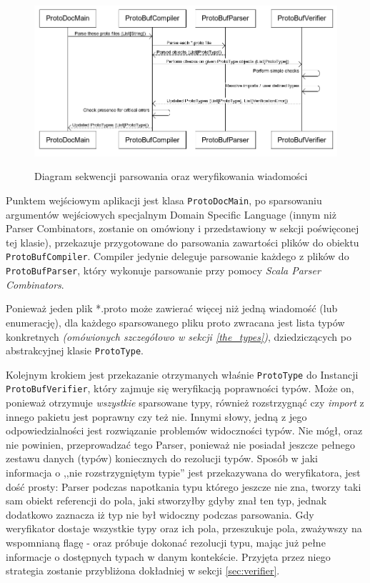 \documentclass[pdflatex,11pt]{aghdpl}
\begin{document}
\begin{figure}[ch]
\begin{center}
 \includegraphics[width=\textwidth]{compile_sequence}
 \label{fig:sequence_diagram_parsing}
\end{center}
\caption{Diagram sekwencji parsowania oraz weryfikowania wiadomości}
\end{figure}

Punktem wejściowym aplikacji jest klasa \verb|ProtoDocMain|, po sparsowaniu argumentów wejściowych specjalnym Domain Specific Language (innym niż
Parser Combinators, zostanie on omówiony i przedstawiony w sekcji poświęconej tej klasie), przekazuje przygotowane do parsowania zawartości plików
do obiektu \verb|ProtoBufCompiler|. Compiler jedynie deleguje parsowanie każdego z plików do \verb|ProtoBufParser|, który wykonuje parsowanie przy pomocy
\textit{Scala Parser Combinators}. 

Ponieważ jeden plik *.proto może zawierać więcej niż jedną wiadomość (lub enumerację), dla każdego sparsowanego
pliku proto zwracana jest lista typów konkretnych \textit{(omówionych szczegółowo w sekcji \ref{the_types})}, dziedziczących po abstrakcyjnej klasie \verb|ProtoType|. 

Kolejnym krokiem jest przekazanie otrzymanych właśnie \verb|ProtoType| do Instancji \verb|ProtoBufVerifier|, który zajmuje się weryfikacją poprawności typów.
Może on, ponieważ otrzymuje \textit{wszystkie} sparsowane typy, również rozstrzygnąć czy \textit{import} z innego pakietu jest poprawny czy też nie. 
Innymi słowy, jedną z jego odpowiedzialności jest rozwiązanie problemów widoczności typów. Nie mógł, oraz nie powinien, przeprowadzać tego Parser, ponieważ 
nie posiadał jeszcze pełnego zestawu danych (typów) koniecznych do rezolucji typów. Sposób w jaki informacja o ,,nie rozstrzygniętym typie'' jest przekazywana
do weryfikatora, jest dość prosty: Parser podczas napotkania typu którego jeszcze nie zna, tworzy taki sam obiekt referencji do pola, jaki stworzyłby gdyby
znał ten typ, jednak dodatkowo zaznacza iż typ nie był widoczny podczas parsowania. Gdy weryfikator dostaje wszystkie typy oraz ich pola, przeszukuje pola,
zważywszy na wspomnianą flagę - oraz próbuje dokonać rezolucji typu, mając już pełne informacje o dostępnych typach w danym kontekście. Przyjęta przez niego 
strategia zostanie przybliżona dokładniej w sekcji \ref{sec:verifier}.
\end{document}
